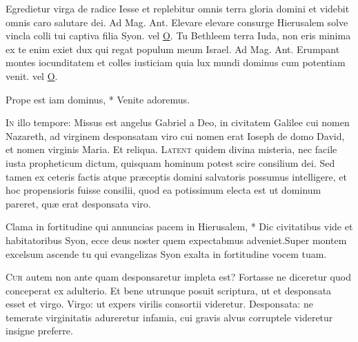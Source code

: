 \begin{multicols*}{2}
 Egredietur virga de radice Iesse et replebitur omnis terra gloria domini et videbit omnis caro salutare dei. {\color{Red} Ad Mag. Ant. } Elevare elevare consurge Hierusalem solve vincla colli tui captiva filia Syon. {\color{Red} vel} \hyperlink{o-antiphons}{O}.
 Tu Bethleem terra Iuda, non eris minima ex te enim exiet dux qui regat populum meum Israel. {\color{Red} Ad Mag. Ant.} Erumpant montes iocunditatem et colles iusticiam quia lux mundi dominus cum potentiam venit. {\color{Red} vel} \hyperlink{o-antiphons}{O}.
\begin{invitatory}
{Prope est iam dominus, * Venite adoremus.}
\end{invitatory}
\lettrine[lines=2]{\zallmancaps \color{Blue} I}{n} illo tempore: Missus est angelus Gabriel a Deo, in civitatem Galilee cui nomen Nazareth, ad virginem desponsatam viro cui nomen erat Ioseph de domo David, et nomen virginis Maria. Et reliqua.
\lettrine[lines=2]{\zallmancaps \color{Red} L}{atent} quidem divina misteria, nec facile iusta propheticum dictum, quisquam hominum potest scire consilium dei. Sed tamen ex ceteris factis atque præceptis domini salvatoris possumus intelligere, et hoc propensioris fuisse consilii, quod ea potissimum electa est ut dominum pareret, quæ erat desponsata viro.
\begin{responsory}
{Clama in fortitudine qui annuncias pacem in Hierusalem, * Dic civitatibus vide et habitatoribus Syon, ecce deus noster quem expectabmus adveniet.}{Super montem excelsum ascende tu qui evangelizas Syon exalta in fortitudine vocem tuam.}
\end{responsory}
\lettrine[lines=2]{\zallmancaps \color{Blue} C}{ur} autem non ante quam desponsaretur impleta est? Fortasse ne diceretur quod conceperat ex adulterio. Et bene utrunque posuit scriptura, ut et desponsata esset et virgo. Virgo: ut expers virilis consortii videretur. Desponsata: ne temerate virginitatis adureretur infamia, cui gravis alvus corruptele videretur insigne preferre.

\end{multicols*}
